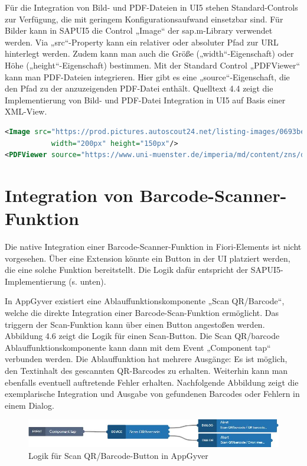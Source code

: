Für die Integration von Bild- und PDF-Dateien in UI5 stehen Standard-Controls zur Verfügung, die mit geringem Konfigurationsaufwand einsetzbar sind. Für Bilder kann in SAPUI5 die Control „Image“ der sap.m-Library verwendet werden. Via „src“-Property kann ein relativer oder absoluter Pfad zur URL hinterlegt werden. Zudem kann man auch die Größe („width“-Eigenschaft) oder Höhe („height“-Eigenschaft) bestimmen. Mit der Standard Control „PDFViewer“ kann man PDF-Dateien integrieren. Hier gibt es eine „source“-Eigenschaft, die den Pfad zu der anzuzeigenden PDF-Datei enthält. Quelltext 4.4 zeigt die Implementierung von Bild- und PDF-Datei Integration in UI5 auf Basis einer XML-View.
\begin{lstlisting}[language=XML,  caption=Implementierung Bild- und PDF Datei Integration in SAPUI5]
<Image src="https://prod.pictures.autoscout24.net/listing-images/0693be87-aaad-4dc8-99c5-a69b3bd48b81_1934e390-16f2-4e47-b248-02e9cc9b746b.jpg"
           width="200px" height="150px"/>
<PDFViewer source="https://www.uni-muenster.de/imperia/md/content/zns/dokumente/beispielexpos___kowi_empirisch.pdf"/>
\end{lstlisting}

\section{Integration von Barcode-Scanner-Funktion}

Die native Integration einer Barcode-Scanner-Funktion in Fiori-Elements ist nicht vorgesehen. Über eine Extension könnte ein Button in der UI platziert werden, die eine solche Funktion bereitstellt. Die Logik dafür entspricht der SAPUI5-Implementierung (s. unten).

In AppGyver existiert eine Ablauffunktionskomponente „Scan QR/Barcode“, welche die direkte Integration einer Barcode-Scan-Funktion ermöglicht. Das triggern der Scan-Funktion kann über einen Button angestoßen werden. Abbildung 4.6 zeigt die Logik für einen Scan-Button. Die Scan QR/barcode Ablauffunktionskomponente kann dann mit dem Event „Component tap“ verbunden werden. Die Ablauffunktion hat mehrere Ausgänge: Es ist möglich, den Textinhalt des gescannten QR-Barcodes zu erhalten. Weiterhin kann man ebenfalls eventuell auftretende Fehler erhalten. Nachfolgende Abbildung zeigt die exemplarische Integration und Ausgabe von gefundenen Barcodes oder Fehlern in einem Dialog.

\begin{figure}[htbp]
 \centering
 \includegraphics[width=1.0\textwidth]{Bilder/appgyver/4_8_logik_scan_barcode.jpg}
 \caption{Logik für Scan QR/Barcode-Button in AppGyver}
\end{figure}

